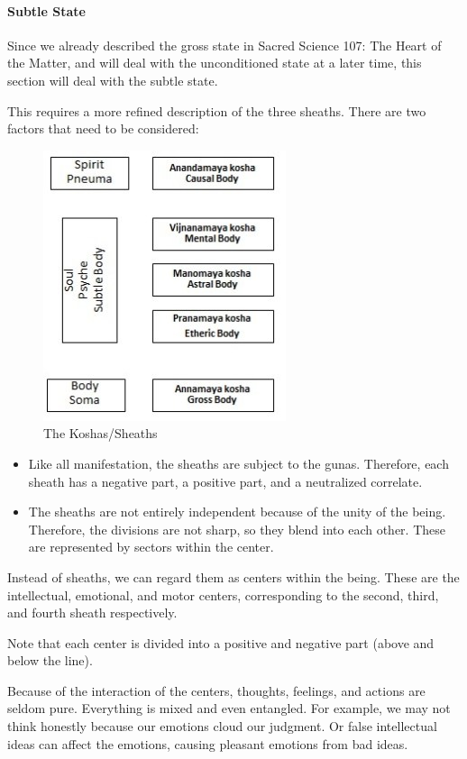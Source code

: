\paragraph{Subtle State}

Since we already described the gross state in Sacred Science 107: The Heart of the Matter, and will deal with the unconditioned state at a later time, this section will deal with the subtle state.

This requires a more refined description of the three sheaths. There are two factors that need to be considered:

\begin{figure}
\includegraphics[scale=.5]{a20221113SacredScience108TheSubtleState-img001.jpg}
\caption{The Koshas/Sheaths}
\end{figure}

\begin{itemize}
\item Like all manifestation, the sheaths are subject to the gunas. Therefore, each sheath has a negative part, a positive part, and a neutralized correlate. 
\item The sheaths are not entirely independent because of the unity of the being. Therefore, the divisions are not sharp, so they blend into each other. These are represented by sectors within the center. 
\end{itemize}
Instead of sheaths, we can regard them as centers within the being. These are the intellectual, emotional, and motor centers, corresponding to the second, third, and fourth sheath respectively.

Note that each center is divided into a positive and negative part (above and below the line).

Because of the interaction of the centers, thoughts, feelings, and actions are seldom pure. Everything is mixed and even entangled. For example, we may not think honestly because our emotions cloud our judgment. Or false intellectual ideas can affect the emotions, causing pleasant emotions from bad ideas.

